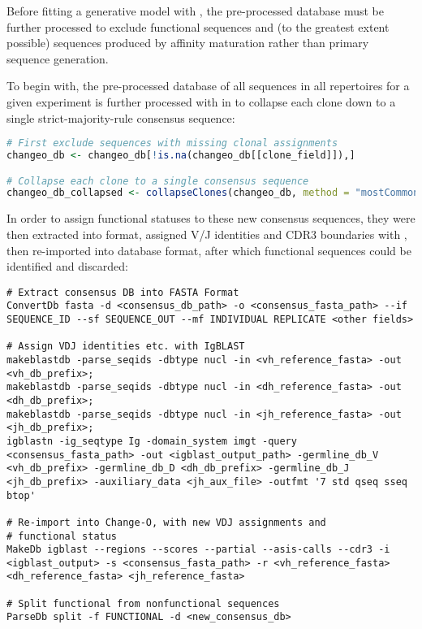 
Before fitting a generative model with , the pre-processed  database must be further processed to exclude functional sequences and (to the greatest extent possible) sequences produced by affinity maturation rather than primary sequence generation.

To begin with, the pre-processed  database of all sequences in all repertoires for a given experiment is further processed with  \parencite{gupta2015changeo} in  to collapse each clone down to a single strict-majority-rule consensus sequence:

\begin{lstlisting}[language=R]
# First exclude sequences with missing clonal assignments
changeo_db <- changeo_db[!is.na(changeo_db[[clone_field]]),]

# Collapse each clone to a single consensus sequence
changeo_db_collapsed <- collapseClones(changeo_db, method = "mostCommon")
\end{lstlisting}

\noindent In order to assign functional statuses to these new consensus sequences, they were then extracted into  format, assigned V/J identities and CDR3 boundaries with , then re-imported into  database format, after which functional sequences could be identified and discarded:

\begin{lstlisting}
# Extract consensus DB into FASTA Format
ConvertDb fasta -d <consensus_db_path> -o <consensus_fasta_path> --if SEQUENCE_ID --sf SEQUENCE_OUT --mf INDIVIDUAL REPLICATE <other fields> 

# Assign VDJ identities etc. with IgBLAST
makeblastdb -parse_seqids -dbtype nucl -in <vh_reference_fasta> -out <vh_db_prefix>;
makeblastdb -parse_seqids -dbtype nucl -in <dh_reference_fasta> -out <dh_db_prefix>;
makeblastdb -parse_seqids -dbtype nucl -in <jh_reference_fasta> -out <jh_db_prefix>;
igblastn -ig_seqtype Ig -domain_system imgt -query <consensus_fasta_path> -out <igblast_output_path> -germline_db_V <vh_db_prefix> -germline_db_D <dh_db_prefix> -germline_db_J <jh_db_prefix> -auxiliary_data <jh_aux_file> -outfmt '7 std qseq sseq btop'

# Re-import into Change-O, with new VDJ assignments and
# functional status
MakeDb igblast --regions --scores --partial --asis-calls --cdr3 -i <igblast_output> -s <consensus_fasta_path> -r <vh_reference_fasta> <dh_reference_fasta> <jh_reference_fasta>

# Split functional from nonfunctional sequences
ParseDb split -f FUNCTIONAL -d <new_consensus_db>
\end{lstlisting}

